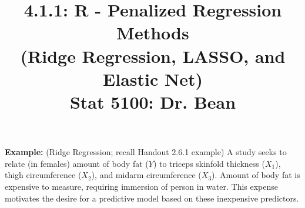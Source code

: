 \documentclass{article}\usepackage[]{graphicx}\usepackage[]{color}
\begin{document}
\title{%
  4.1.1: R - Penalized Regression Methods \\
  (Ridge Regression, LASSO, and Elastic Net) \\
  \smallskip
  \large Stat 5100: Dr. Bean
}
\date{}

\maketitle

\textbf{Example: } (Ridge Regression; recall Handout 2.6.1 example) A study seeks to relate (in females) amount of body fat ($Y$) to triceps skinfold thickness ($X_1$), thigh circumference ($X_2$), and midarm circumference ($X_3$).  Amount of body fat is expensive to measure, requiring immersion of person in water.  This expense motivates the desire for a predictive model based on these inexpensive predictors.
\end{document}
